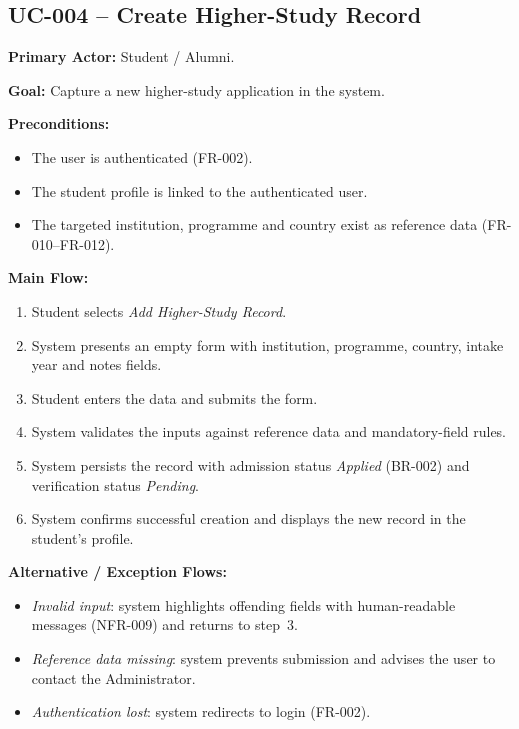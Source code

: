 \documentclass[11pt,a4paper]{article}
\begin{document}
\subsection{UC-004 -- Create Higher-Study Record}

\noindent\textbf{Primary Actor:} Student / Alumni.

\medskip

\noindent\textbf{Goal:} Capture a new higher-study application in the system.

\medskip

\noindent\textbf{Preconditions:}
\begin{itemize}
  \item The user is authenticated (FR-002).
  \item The student profile is linked to the authenticated user.
  \item The targeted institution, programme and country exist as reference data (FR-010--FR-012).
\end{itemize}

\medskip

\noindent\textbf{Main Flow:}
\begin{enumerate}
  \item Student selects \emph{Add Higher-Study Record}.
  \item System presents an empty form with institution, programme, country, intake year and notes fields.
  \item Student enters the data and submits the form.
  \item System validates the inputs against reference data and mandatory-field rules.
  \item System persists the record with admission status \emph{Applied} (BR-002) and verification status \emph{Pending}.
  \item System confirms successful creation and displays the new record in the student's profile.
\end{enumerate}

\medskip

\noindent\textbf{Alternative / Exception Flows:}
\begin{itemize}
  \item \emph{Invalid input}: system highlights offending fields with human-readable messages (NFR-009) and returns to step~3.
  \item \emph{Reference data missing}: system prevents submission and advises the user to contact the Administrator.
  \item \emph{Authentication lost}: system redirects to login (FR-002).
\end{itemize}
\end{document}
